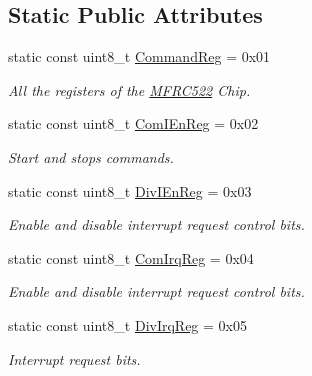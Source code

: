 \subsection*{Static Public Attributes}
\begin{DoxyCompactItemize}
\item 
static const uint8\+\_\+t \hyperlink{classMFRC522_a0b1c450a48fb3276a360c0a27bb93542}{Command\+Reg} = 0x01
\begin{DoxyCompactList}\small\item\em All the registers of the \hyperlink{classMFRC522}{M\+F\+R\+C522} Chip. \end{DoxyCompactList}\item 
\mbox{\label{classMFRC522_a76de8291c84f20fe04af16463faffdac}} 
static const uint8\+\_\+t \hyperlink{classMFRC522_a76de8291c84f20fe04af16463faffdac}{Com\+I\+En\+Reg} = 0x02
\begin{DoxyCompactList}\small\item\em Start and stops commands. \end{DoxyCompactList}\item 
\mbox{\label{classMFRC522_abe05fe9fcedbb34cde4ef0f09c7373db}} 
static const uint8\+\_\+t \hyperlink{classMFRC522_abe05fe9fcedbb34cde4ef0f09c7373db}{Div\+I\+En\+Reg} = 0x03
\begin{DoxyCompactList}\small\item\em Enable and disable interrupt request control bits. \end{DoxyCompactList}\item 
\mbox{\label{classMFRC522_a5bb072accfc1422669f46aec2daddc08}} 
static const uint8\+\_\+t \hyperlink{classMFRC522_a5bb072accfc1422669f46aec2daddc08}{Com\+Irq\+Reg} = 0x04
\begin{DoxyCompactList}\small\item\em Enable and disable interrupt request control bits. \end{DoxyCompactList}\item 
\mbox{\label{classMFRC522_ae83309384b82b6f274b5775cd76b0510}} 
static const uint8\+\_\+t \hyperlink{classMFRC522_ae83309384b82b6f274b5775cd76b0510}{Div\+Irq\+Reg} = 0x05
\begin{DoxyCompactList}\small\item\em Interrupt request bits. \end{DoxyCompactList}\item 

\end{DoxyCompactItemize}

